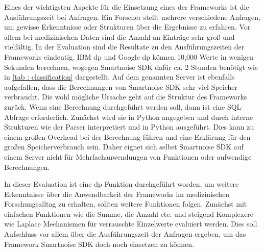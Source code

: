 Eines der wichtigsten Aspekte für die Einsetzung eines der Frameworks ist die Ausführungszeit bei Anfragen. Ein Forscher stellt mehrere verschiedene Anfragen, um gewisse Erkenntnisse oder Strukturen über die Ergebnisse zu erfahren. Vor allem bei medizinischen Daten sind die Anzahl an Einträge sehr groß und vielfältig. In der Evaluation sind die Resultate zu den Ausführungszeiten der Frameworks eindeutig. IBM \gls{dp} und Google \gls{dp} können 10,000 Werte in wenigen Sekunden berechnen, wogegen Smartnoise SDK dafür ca. 2 Stunden benötigt wie in \cref{tab : classification} dargestellt. Auf dem genannten Server ist ebenfalls aufgefallen, dass die Berechnungen von Smartnoise SDK sehr viel Speicher verbraucht. Die wohl mögliche Ursache geht auf die Struktur des Frameworks zurück. Wenn eine Berechnung durchgeführt werden soll, dann ist eine SQL-Abfrage erforderlich. Zunächst wird sie in Python angegeben und durch interne Strukturen wie der Parser interpretiert und in Python ausgeführt. Dies kann zu einem großen Overhead bei der Berechnung führen und eine Erklärung für den großen Speicherverbrauch sein. Daher eignet sich selbst Smartnoise SDK auf einem Server nicht für Mehrfachanwendungen von Funktionen oder aufwendige Berechnungen.

In dieser Evaluation ist eine \gls{dp} Funktion durchgeführt worden, um weitere Erkenntnisse über die Anwendbarkeit der Frameworks im medizinischen Forschungsalltag zu erhalten, sollten weitere Funktionen folgen. Zunächst mit einfachen Funktionen wie die Summe, die Anzahl etc. und steigend Komplexere wie Laplace Mechanismen für verrauschte Einzelwerte evaluiert werden. Dies soll Aufschluss vor allem über die Ausführungszeit der Anfragen ergeben, um das Framework Smartnoise SDK doch noch einsetzen zu können.  

